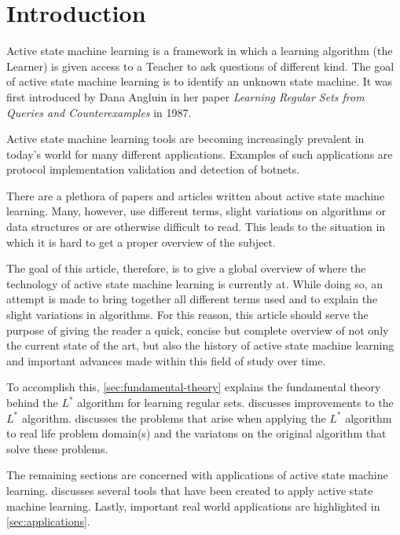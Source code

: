 \documentclass[multi,crop=false,class=article]{standalone}
\begin{document}
\section*{Introduction}
\label{sec:introduction}

Active state machine learning is a framework in which a learning algorithm (the
Learner) is given access to a Teacher to ask questions of different kind. The
goal of active state machine learning is to identify an unknown state machine.
It was first introduced by Dana Angluin in her paper \textit{Learning Regular
Sets from Queries and Counterexamples} in 1987\cite{Angluin1987}.

Active state machine learning tools are becoming increasingly prevalent in
today's world for many different applications.  Examples
of such applications are protocol implementation validation and detection of
botnets. 

There are a plethora of papers and articles written about active state machine
learning. Many, however, use different terms, slight variations on algorithms
or data structures or are otherwise difficult to read. This leads to the
situation in which it is hard to get a proper overview of the subject.

The goal of this article, therefore, is to give a global overview of where the
technology of active state machine learning is currently at. While doing so, an
attempt is made to bring together all different terms used and to explain the
slight variations in algorithms. For this reason, this article should serve the
purpose of giving the reader a quick, concise but complete overview of not only
the current state of the art, but also the history of active state machine
learning and important advances made within this field of study over time.

To accomplish this, \cref{sec:fundamental-theory} explains the fundamental
theory behind the $L^{*}$ algorithm for learning regular
sets.  discusses improvements to the $L^{*}$
algorithm.  discusses the problems that arise when applying
the $L^{*}$ algorithm to real life problem domain(s) and the variatons on the
original algorithm that solve these problems.

The remaining sections are concerned with applications of active state machine
learning.  discusses several tools that have been created to
apply active state machine learning. Lastly, important real world applications
are highlighted in \cref{sec:applications}.
\end{document}
